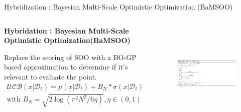 \begin{frame}{Hybridization : Bayesian Multi-Scale Optimistic Optimization (BaMSOO)}
    \begin{columns}
        \begin{column}{0.5\textwidth}
            \textbf{Hybridation : Bayesian Multi-Scale Optimistic Optimization(BaMSOO)}

            Replace the scoring of SOO with a BO-GP based approximation to determine if it's relevant to evaluate the point.
            \begin{equation}
                \begin{split}
                \mathcal{UCB}(x| \mathcal D_t) = \mu(x|\mathcal D_t) +  B_N * \sigma(x|\mathcal D_t) 
                \\ \text{with } B_N = \sqrt{2 \log (\pi^2 N^2/6 \eta)} , \eta \in (0,1)      
                \end{split}  
                \label{eq:ucb}
            \end{equation}
            
        \end{column}        
        \begin{column}{0.5\textwidth}
            \begin{figure}[h]
                \centering
                \includegraphics[trim={0 0 12cm 0},clip,height = 5cm]{imgs/algo/bamsoo_score.png}
            \end{figure}
        \end{column}
    \end{columns}
\end{frame}
